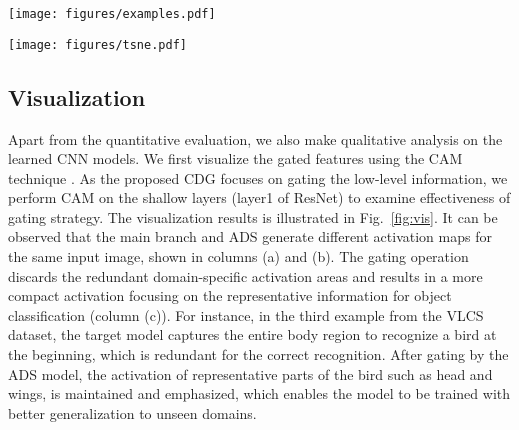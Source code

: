 \begin{figure*}
  \texttt{[image: figures/examples.pdf]}
  \caption{More examples of CAM visualization. (a) and (c) show the original and gated attention of the target model, respectively, while (b) exhibits the attention of the ADS model which has very different statistics from the target model. Note, the feature maps are extracted from the layer1 of ResNet-18.}
  \label{fig:vis}
\end{figure*}
\begin{figure*}
  \texttt{[image: figures/tsne.pdf]}
  \caption{T-SNE visualization of domain embeddings on ResNet-18 trained in a vanilla manner (the top row), the random dropout method that randomly mutes the channels (the middle row), and our CDG (the bottom row). The embeddings learned with CDG are more compact than the others. Spots of the same colors refer to the images of the same category. Different columns present the results on different domains in cross-domain validation.}
  \label{fig:tsne}
\end{figure*}

\subsection{Visualization}
Apart from the quantitative evaluation, we also make qualitative analysis on the learned CNN models. We first visualize the gated features using the CAM technique \citep{zhou2016learning}. As the proposed CDG focuses on gating the low-level information, we perform CAM on the shallow layers (\eg layer1 of ResNet) to examine effectiveness of gating strategy. The visualization results is illustrated in Fig.~\ref{fig:vis}. It can be observed that the main branch and ADS generate different activation maps for the same input image, shown in columns (a) and (b). The gating operation discards the redundant domain-specific activation areas and results in a more compact activation focusing on the representative information for object classification (column (c)). For instance, in the third example from the VLCS dataset, the target model captures the entire body region to recognize a bird at the beginning, which is redundant for the correct recognition. After gating by the ADS model, the activation of representative parts of the bird such as head and wings, is maintained and emphasized, which enables the model to be trained with better generalization to unseen domains.

